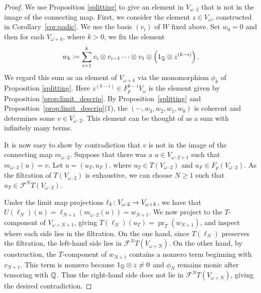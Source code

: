 \documentclass[runningheads]{llncs}
\begin{document}
\begin{proof}
We use Proposition \ref{splitting} to give an element in $V_{\omega \cdot 2 }$ that is not in the image of the connecting map. First, we consider the element $z \in V_{\omega}$, constructed in Corollary~\ref{cor:padic}. We use the basis $(v_i)$ of $W$ fixed above. Set $w_0 = 0$ and then for each $V_{\omega + k}$, where $k>0$, we fix the element
\begin{equation*}
w_k  \coloneqq \sum_{i = 1}^k v_i \otimes v_{i-1} \cdots \otimes v_1 \otimes \left( 1_{\mathbb{Q}} \otimes z^{(k-i)}\right).
\end{equation*}
We regard this sum as an element of $V_{\omega + k}$ via the monomorphism $\phi_k$ of Proposition \ref{splitting}.
Here $z^{(k-i)} \in F_p^{k-i} V_{\omega}$ is the element given by Proposition \ref{prop:limit_descrip}. By Proposition~\ref{splitting} and
Proposition~\ref{prop:limit_descrip}(1), the $(\cdots, w_3, w_2, w_1, w_0)$ is coherent and determines some $v \in V_{\omega \cdot 2 }.$ This element can be thought of as a sum with infinitely many terms.



It is now easy to show by contradiction that $v$ is not in the image of the connecting map $m_{\omega \cdot 2 }$.
Suppose that there was a $u\in V_{\omega\cdot 2 +1}$ such that $m_{\omega \cdot 2}(u) = v.$ 
Let $u= (u_T, u_F)$. where $u_T\in T(V_{\omega\cdot 2})$ and $u_F \in F_p(V_{\omega \cdot 2}).$ 
As the filtration of $T(V_{\omega \cdot 2})$ is exhaustive, we can choose $N\geq 1$ such that $u_T\in \mathcal F^N T(V_{\omega \cdot 2})$.


Under the limit map projections $\ell_k \colon V_{\omega \cdot 2} \to V_{\omega + k}$, we have that $U(\ell_N)(u) = \ell_{N+1}(m_{\omega \cdot 2}(u)) = w_{N+1}$.
We now project to the $T$-component of $V_{\omega + N + 1}$, giving $T(\ell_N)(u_T) = \operatorname{pr}_T(w_{N+1})$, and inspect where each side lies in the filtration.
On the one hand, since $T(\ell_N)$ preserves the filtration, the left-hand side lies in $\mathcal F^N T(V_{\omega + N})$.
On the other hand, by construction, the $T$-component of $w_{N+1}$ contains a nonzero term beginning with $v_{N+1}$.
This term is nonzero because $1_{\mathbb{Q}} \otimes z \neq 0$ and $\phi_N$ remains monic after tensoring with $\mathbb{Q}$.
Thus the right-hand side does not lie in $\mathcal F^N T(V_{\omega + N})$, giving the desired contradiction.





\end{proof}
\end{document}
